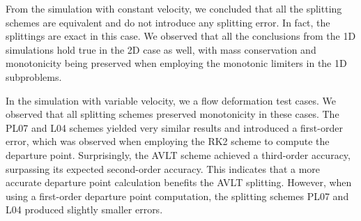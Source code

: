 From the simulation with constant velocity, we concluded that all the splitting
schemes are equivalent and do not introduce any splitting error.
In fact, the splittings are exact in this case.
We observed that all the conclusions from the 1D simulations hold true in the 2D case as well,
with mass conservation and monotonicity being preserved when employing the monotonic limiters in the 1D subproblems.

In the simulation with variable velocity, we a flow deformation test cases. 
We observed that all splitting schemes preserved monotonicity in these cases.
The PL07 and L04 schemes yielded very similar results and introduced a first-order error,
which was observed when employing the RK2 scheme to compute the departure point.
Surprisingly, the AVLT scheme achieved a third-order accuracy, surpassing its expected second-order accuracy.
This indicates that a more accurate departure point calculation benefits the AVLT splitting.
However, when using a first-order departure point computation, the splitting schemes PL07 and L04 produced slightly smaller errors.
